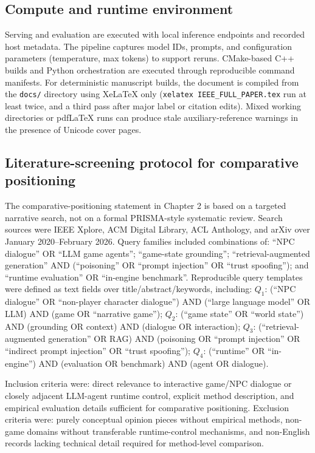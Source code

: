 ﻿\documentclass[a4paper,12pt]{article}
\begin{document}
\subsection{Compute and runtime environment}
Serving and evaluation are executed with local inference endpoints and recorded host metadata. The pipeline captures model IDs, prompts, and configuration parameters (temperature, max tokens) to support reruns. CMake-based C++ builds and Python orchestration are executed through reproducible command manifests.
For deterministic manuscript builds, the document is compiled from the \texttt{docs/} directory using XeLaTeX only (\texttt{xelatex IEEE\_FULL\_PAPER.tex} run at least twice, and a third pass after major label or citation edits). Mixed working directories or pdfLaTeX runs can produce stale auxiliary-reference warnings in the presence of Unicode cover pages.

\subsection{Literature-screening protocol for comparative positioning}
The comparative-positioning statement in Chapter 2 is based on a targeted narrative search, not on a formal PRISMA-style systematic review. Search sources were IEEE Xplore, ACM Digital Library, ACL Anthology, and arXiv over January 2020--February 2026. Query families included combinations of: ``NPC dialogue'' OR ``LLM game agents''; ``game-state grounding''; ``retrieval-augmented generation'' AND (``poisoning'' OR ``prompt injection'' OR ``trust spoofing''); and ``runtime evaluation'' OR ``in-engine benchmark''. Reproducible query templates were defined as text fields over title/abstract/keywords, including: \(Q_1\): (``NPC dialogue'' OR ``non-player character dialogue'') AND (``large language model'' OR LLM) AND (game OR ``narrative game''); \(Q_2\): (``game state'' OR ``world state'') AND (grounding OR context) AND (dialogue OR interaction); \(Q_3\): (``retrieval-augmented generation'' OR RAG) AND (poisoning OR ``prompt injection'' OR ``indirect prompt injection'' OR ``trust spoofing''); \(Q_4\): (``runtime'' OR ``in-engine'') AND (evaluation OR benchmark) AND (agent OR dialogue).

Inclusion criteria were: direct relevance to interactive game/NPC dialogue or closely adjacent LLM-agent runtime control, explicit method description, and empirical evaluation details sufficient for comparative positioning. Exclusion criteria were: purely conceptual opinion pieces without empirical methods, non-game domains without transferable runtime-control mechanisms, and non-English records lacking technical detail required for method-level comparison.
\end{document}
